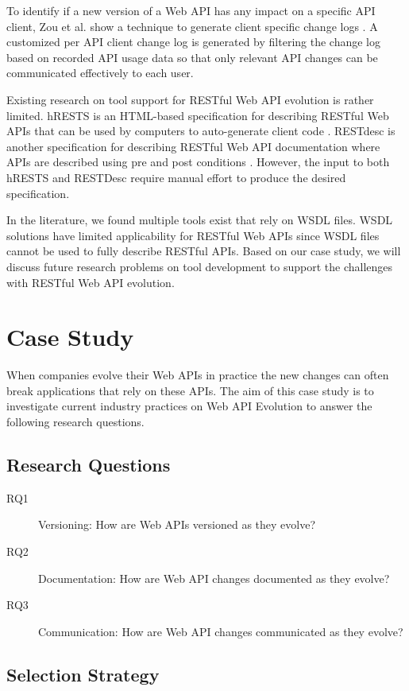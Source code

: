 \documentclass[conference]{IEEEtran}
\begin{document}
To identify if a new version of a Web API has any impact on a specific API client,  Zou et al. show a technique to generate client specific change logs \cite{le2008synchronizing}. A customized per API client change log is generated by filtering the change log based on  recorded API usage data so that only relevant API changes can be communicated effectively to each user.

Existing research on tool support for RESTful Web API evolution is rather limited. hRESTS is an HTML-based specification for describing RESTful Web APIs that can be used by computers to auto-generate client code \cite{4740521}. RESTdesc is another specification for describing RESTful Web API documentation where APIs are described using pre and post conditions \cite{RESTdesc}. However, the input to both hRESTS and RESTDesc require manual effort to produce the desired specification.

In the literature, we found multiple tools exist that rely on WSDL files. WSDL solutions have limited applicability for RESTful Web APIs since WSDL files cannot be used to fully describe RESTful APIs. Based on our case study, we will discuss future research problems on tool development to support the challenges with RESTful Web API evolution.

\section{Case Study}
When companies evolve their Web APIs in practice the new changes can often break applications that rely on these APIs. The aim of this case study is to investigate current industry practices on Web API Evolution to answer the following research questions.

\subsection{Research Questions} %

\begin{description}
  \item[RQ1] Versioning: How are Web APIs versioned as they evolve?
  \item[RQ2] Documentation: How are Web API changes documented as they evolve?
  \item[RQ3] Communication: How are Web API changes communicated as they evolve?
\end{description}

\subsection{Selection Strategy} %
\label{sub:selection_strategy}
\end{document}
